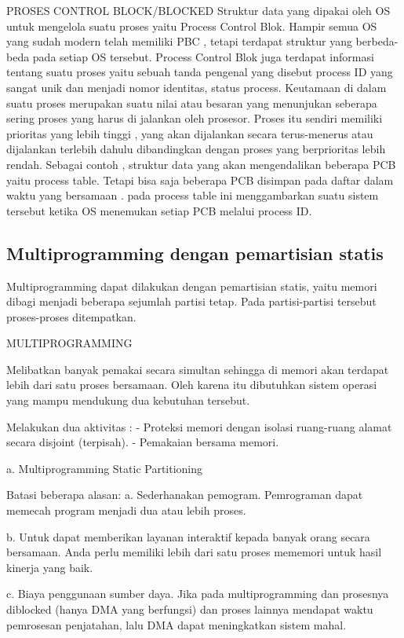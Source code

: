 	PROSES CONTROL BLOCK/BLOCKED
Struktur data yang dipakai oleh OS untuk mengelola suatu proses yaitu Process Control Blok. Hampir semua OS yang sudah modern telah memiliki PBC , tetapi terdapat struktur yang berbeda-beda pada setiap OS tersebut. Process Control Blok juga terdapat informasi tentang suatu proses yaitu sebuah tanda pengenal yang disebut process ID yang sangat unik dan menjadi nomor identitas, status process. Keutamaan di dalam suatu proses merupakan suatu nilai atau besaran yang menunjukan seberapa sering proses yang harus di jalankan oleh prosesor. Proses itu sendiri memiliki prioritas yang lebih tinggi , yang akan dijalankan secara terus-menerus atau dijalankan terlebih dahulu dibandingkan dengan proses yang berprioritas lebih rendah. Sebagai contoh , struktur data yang akan mengendalikan beberapa PCB yaitu process table. Tetapi bisa saja beberapa PCB disimpan pada daftar dalam waktu yang bersamaan . pada process table ini menggambarkan suatu sistem tersebut ketika OS menemukan setiap PCB melalui process ID.


\subsection {Multiprogramming dengan pemartisian statis}
Multiprogramming dapat dilakukan dengan pemartisian statis, yaitu memori dibagi menjadi beberapa sejumlah partisi tetap. Pada partisi-partisi tersebut proses-proses ditempatkan.


	MULTIPROGRAMMING

	Melibatkan banyak pemakai secara simultan sehingga di memori akan terdapat lebih dari satu proses bersamaan. Oleh karena itu dibutuhkan sistem operasi yang mampu mendukung dua kebutuhan tersebut.

	Melakukan dua aktivitas :
	- Proteksi memori dengan isolasi ruang-ruang alamat secara disjoint (terpisah).
	- Pemakaian bersama memori.

a. Multiprogramming Static Partitioning

	Batasi beberapa alasan:
	a. Sederhanakan pemogram.
	Pemrograman dapat memecah program menjadi dua atau lebih proses.

	b. Untuk dapat memberikan layanan interaktif kepada banyak orang secara bersamaan. Anda perlu memiliki lebih dari satu proses mememori untuk hasil kinerja yang baik.

	c. Biaya penggunaan sumber daya.
	Jika pada multiprogramming dan prosesnya diblocked (hanya DMA yang berfungsi) dan proses lainnya mendapat waktu pemrosesan penjatahan, lalu DMA dapat meningkatkan sistem mahal.

